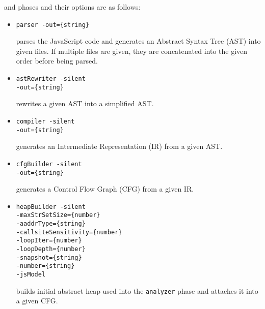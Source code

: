 and phases and their options are as follows:
\begin{itemize}
\item \verb!parser -out={string}!

parses the JavaScript code and generates an Abstract Syntax Tree (AST)
into given files. If multiple files are given, they are concatenated
into the given order before being parsed.

\item \verb!astRewriter -silent!\\
\hspace*{6.3em}\verb!-out={string}!

rewrites a given AST into a simplified AST.

\item \verb!compiler -silent!\\
\hspace*{4.7em}\verb!-out={string}!

generates an Intermediate Representation (IR) from a given AST.

\item \verb!cfgBuilder -silent!\\
\hspace*{5.8em}\verb!-out={string}!

generates a Control Flow Graph (CFG) from a given IR.

\item \verb!heapBuilder -silent!\\
\hspace*{6.3em}\verb!-maxStrSetSize={number}!\\
\hspace*{6.3em}\verb!-aaddrType={string}!\\
\hspace*{6.3em}\verb!-callsiteSensitivity={number}!\\
\hspace*{6.3em}\verb!-loopIter={number}!\\
\hspace*{6.3em}\verb!-loopDepth={number}!\\
\hspace*{6.3em}\verb!-snapshot={string}!\\
\hspace*{6.3em}\verb!-number={string}!\\
\hspace*{6.3em}\verb!-jsModel!

builds initial abstract heap used into the \verb!analyzer! phase
and attaches it into a given CFG.


\end{itemize}
